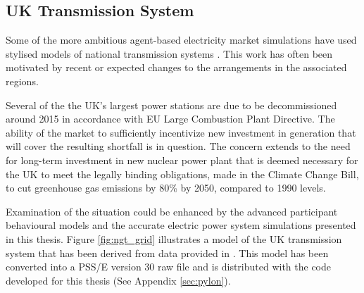 \subsection{UK Transmission System}
Some of the more ambitious agent-based electricity market simulations have used
stylised models of national transmission systems
\cite{cincotti:09,weidlich:06}.  This work has often been motivated by recent
or expected changes to the arrangements in the associated regions.


Several of the the UK's largest power stations are due to be decommissioned
around 2015 in accordance with EU Large Combustion Plant Directive.  The
ability of the market to sufficiently incentivize new investment in generation
that will cover the resulting shortfall is in question.  The concern extends
to the need for long-term investment in new nuclear power plant that is deemed
necessary for the UK to meet the legally binding obligations, made in the
Climate Change Bill, to cut greenhouse gas emissions by 80\% by 2050, compared
to 1990 levels.

Examination of the situation could be enhanced by the advanced participant
behavioural models and the accurate electric power system simulations
presented in this thesis.  Figure \ref{fig:ngt_grid} illustrates a model of
the UK transmission system that has been derived from data provided in
.  This model has been converted into a PSS/E version 30 raw
file and is distributed with the code developed for this thesis (See Appendix
\ref{sec:pylon}).

